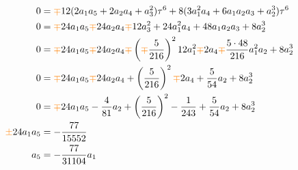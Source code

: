 \documentclass{article}
\begin{document}
\begin{align*}
0 & = \textcolor{orange}{\mp}12(2 a_1 a_5 + 2 a_2 a_4 + a_3^2) \tau^6 + 8(3 a_1^2 a_4 + 6 a_1 a_2 a_3 + a_2^3) \tau^6 \\
0 & = \textcolor{orange}{\mp}24 a_1 a_5 \textcolor{orange}{\mp} 24 a_2 a_4 \textcolor{orange}{\mp} 12 a_3^2 + 24 a_1^2 a_4 + 48 a_1 a_2 a_3 + 8 a_2^3\\
0 & = \textcolor{orange}{\mp}24 a_1 a_5 \textcolor{orange}{\mp} 24 a_2 a_4 \textcolor{orange}{\mp} \left(\textcolor{orange}{\mp} \frac{5}{216}\right)^2 12 a_1^2 \textcolor{orange}{\mp} 2 a_4 \textcolor{orange}{\mp} \frac{5 \cdot 48}{216} a_1^2 a_2 + 8 a_2^3 \\
0 & = \textcolor{orange}{\mp}24 a_1 a_5 \textcolor{orange}{\mp} 24 a_2 a_4 + \left(\frac{5}{216}\right)^2 \textcolor{orange}{\mp} 2 a_4 + \frac{5}{54} a_2 + 8 a_2^3 \\
0 & = \textcolor{orange}{\mp}24 a_1 a_5 - \frac{4}{81} a_2 + \left(\frac{5}{216}\right)^2 - \frac{1}{243} + \frac{5}{54} a_2 + 8 a_2^3 \\
\textcolor{orange}{\pm}24 a_1 a_5 & = -\frac{77}{15552} \\
a_5 & = -\frac{77}{31104} a_1 \\
\end{align*}
\end{document}
